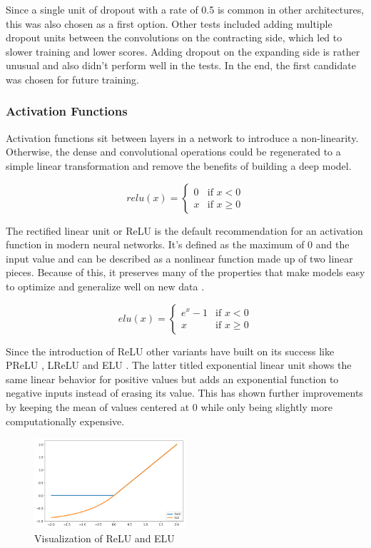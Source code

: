 Since a single unit of dropout with a rate of 0.5 is common in other architectures, this was also chosen as a first option. Other tests included adding multiple dropout units between the convolutions on the contracting side, which led to slower training and lower scores. Adding dropout on the expanding side is rather unusual and also didn't perform well in the tests. In the end, the first candidate was chosen for future training.

\subsubsection{Activation Functions}

Activation functions sit between layers in a network to introduce a non-linearity. Otherwise, the dense and convolutional operations could be regenerated to a simple linear transformation and remove the benefits of building a deep model.

\[
relu(x) =
\begin{cases} 
0 & \text{if } x < 0  \\
x & \text{if } x \geq 0
\end{cases}
\]

The rectified linear unit or ReLU \cite{Nair} is the default recommendation for an activation function in modern neural networks. It's defined as the maximum of 0 and the input value and can be described as a nonlinear function made up of two linear pieces. Because of this, it preserves many of the properties that make models easy to optimize and generalize well on new data \cite{Goodfellow2016}.

\[
elu(x) =
\begin{cases} 
e^x - 1 & \text{if } x < 0  \\
x & \text{if } x \geq 0
\end{cases}
\]

Since the introduction of ReLU other variants have built on its success like PReLU \cite{He2015a}, LReLU and ELU \cite{Clevert2015}. The latter titled exponential linear unit shows the same linear behavior for positive values but adds an exponential function to negative inputs instead of erasing its value.  This has shown further improvements by keeping the mean of values centered at 0 while only being slightly more computationally expensive.

\begin{figure}[H]
\centering
\par
\includegraphics[width=0.5\textwidth]{imgs/elu_relu3.png}
\caption{Visualization of ReLU and ELU}
\par
\end{figure}

